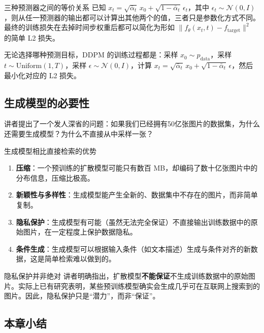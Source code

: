 \documentclass[a4paper]{article}
\begin{document}
\begin{knowledgebox}{三种预测器之间的等价关系}
已知 $x_t = \sqrt{\bar{\alpha}_t}\, x_0 + \sqrt{1-\bar{\alpha}_t}\, \epsilon_t$，其中 $\epsilon_t \sim \mathcal{N}(0, I)$，则从任一预测器的输出都可以计算出其他两个的值，三者只是参数化方式不同。最终的训练损失在去掉时间步权重后都可以简化为形如 $\|f_\theta(x_t, t) - f_{\text{target}}\|^2$ 的简单 L2 损失。
\end{knowledgebox}

无论选择哪种预测目标，DDPM 的训练过程都是：采样 $x_0 \sim p_{\text{data}}$，采样 $t \sim \text{Uniform}(1,T)$，采样 $\epsilon \sim \mathcal{N}(0,I)$，计算 $x_t = \sqrt{\bar{\alpha}_t}\, x_0 + \sqrt{1-\bar{\alpha}_t}\, \epsilon$，然后最小化对应的 L2 损失。

\subsection{生成模型的必要性}

讲者提出了一个发人深省的问题：如果我们已经拥有50亿张图片的数据集，为什么还需要生成模型？为什么不直接从中采样一张？

\begin{importantbox}{生成模型相比直接检索的优势}
\begin{enumerate}
    \item \textbf{压缩}：一个预训练的扩散模型可能只有数百 MB，却编码了数十亿张图片中的分布信息，压缩比极高。
    \item \textbf{新颖性与多样性}：生成模型能产生全新的、数据集中不存在的图片，而非简单复制。
    \item \textbf{隐私保护}：生成模型有可能（虽然无法完全保证）不直接输出训练数据中的原始图片，在一定程度上保护数据隐私。
    \item \textbf{条件生成}：生成模型可以根据输入条件（如文本描述）生成与条件对齐的新数据，这是简单检索难以做到的。
\end{enumerate}
\end{importantbox}

\begin{warningbox}{隐私保护并非绝对}
讲者明确指出，扩散模型\textbf{不能保证}不生成训练数据中的原始图片。实际上已有研究表明，某些预训练模型确实会生成几乎可在互联网上搜索到的图片。因此，隐私保护只是``潜力''，而非``保证''。
\end{warningbox}

\subsection{本章小结}
\end{document}
